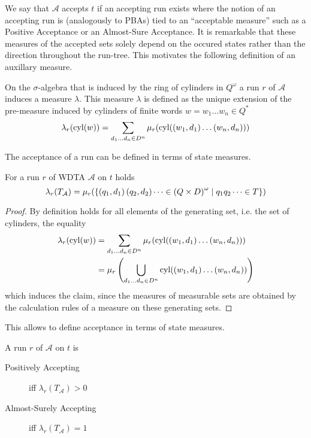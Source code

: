 We say that $\mathcal{A}$ accepts $t$ if an accepting run exists where the
notion of an accepting run is (analogously to \acp{PBA}) tied to an
\enquote{acceptable measure} such as a Positive Acceptance or an Almost-Sure
Acceptance. It is remarkable that these measures of the accepted sets solely
depend on the occured states rather than the direction throughout the run-tree.
This motivates the following definition of an auxillary measure.
\begin{definition}
  On the $\sigma$-algebra that is induced by the ring of cylinders in
  $Q^{\omega}$ a run $r$ of $\mathcal{A}$ induces a measure $\lambda$.
  This measure $\lambda$ is defined as the unique extension of the pre-measure
  induced by cylinders of finite words $w = w_{1}\dots w_{n}\in Q^{*}$
  \begin{equation*}
    \lambda_{r}(\operatorname{cyl}(w)) = \sum\limits_{d_{1}\dots d_{n}\in D^{n}}\mu_{r}(
      \operatorname{cyl}(\left(w_{1}, d_{1}\right)\dots\left(w_{n},d_{n}\right)))
  \end{equation*}
\end{definition}
The acceptance of a run can be defined in terms of state measures.
\begin{lemma}
  For a run $r$ of \ac{WDTA} $\mathcal{A}$ on $t$ holds
  \begin{equation*}
    \lambda_{r}(T_{\mathcal{A}}) = \mu_{r}(\left\{\left(q_{1},d_{1}\right)
    \left(q_{2},d_{2}\right)\dots\in\left(Q\times D\right)^{\omega}\mid q_{1}q_{2}\dots\in T\right\})
  \end{equation*}
\end{lemma}
\begin{proof}
  By definition holds for all elements of the generating set, i.e. the set of
  cylinders, the equality
  \begin{align*}
    \lambda_{r}(\operatorname{cyl}(w)) &= \sum\limits_{d_{1}\dots d_{n}\in D^{n}}\mu_{r}(
      \operatorname{cyl}(\left(w_{1}, d_{1}\right)\dots\left(w_{n},d_{n}\right)))\\
      &= \mu_{r}\left(\bigcup\limits_{d_{1}\dots d_{n}\in D^{n}}
      \operatorname{cyl}(\left(w_{1}, d_{1}\right)\dots\left(w_{n},d_{n}\right))\right)
  \end{align*}
  which induces the claim, since the measures of measurable sets are obtained
  by the calculation rules of a measure on these generating sets.
\end{proof}
This allows to define acceptance in terms of state measures.
\begin{corollary}
  A run $r$ of $\mathcal{A}$ on $t$ is 
  \begin{description}
    \item[Positively Accepting] iff $\lambda_{r}(T_{\mathcal{A}}) > 0$
    \item[Almost-Surely Accepting] iff $\lambda_{r}(T_{\mathcal{A}}) = 1$
  \end{description}
\end{corollary}

